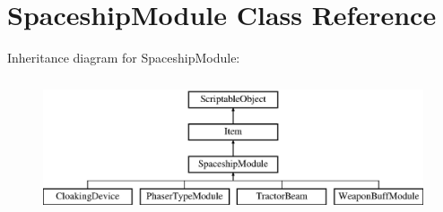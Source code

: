 \hypertarget{class_spaceship_module}{}\section{Spaceship\+Module Class Reference}
\label{class_spaceship_module}
Inheritance diagram for Spaceship\+Module\+:\begin{figure}[H]
\begin{center}
\leavevmode
\includegraphics[height=4.000000cm]{class_spaceship_module}
\end{center}
\end{figure}
